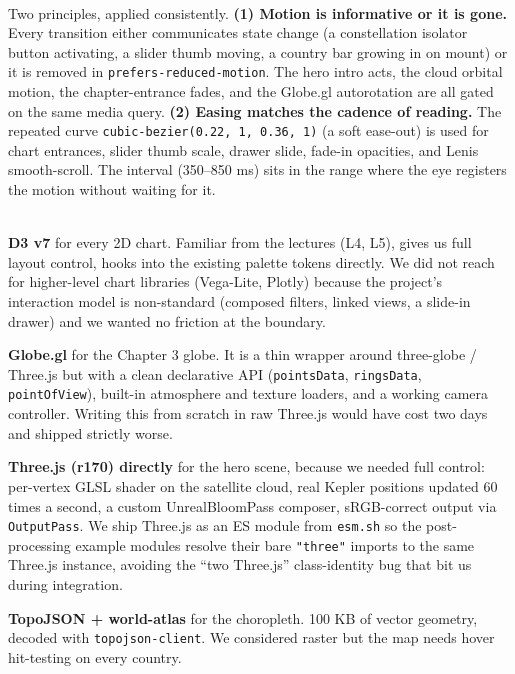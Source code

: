 \documentclass[9pt,a4paper]{article}
\newcommand{\subhead}[1]{%
  \vspace{4pt}%
  \noindent\tcbox[
    on line,
    colback=accentBlue!10!white, colframe=accentBlue,
    boxrule=0.3pt, arc=2.5pt,
    left=7pt, right=7pt, top=0.5pt, bottom=0.5pt,
  ]{\small\bfseries\color{accentBlue!85!black}#1}\\[2pt]%
}
\begin{document}
\vspace{2pt}

\subhead{Motion}

Two principles, applied consistently. \textbf{(1) Motion is informative or it is gone.} Every transition either communicates state change (a constellation isolator button activating, a slider thumb moving, a country bar growing in on mount) or it is removed in \texttt{prefers-reduced-motion}. The hero intro acts, the cloud orbital motion, the chapter-entrance fades, and the Globe.gl autorotation are all gated on the same media query. \textbf{(2) Easing matches the cadence of reading.} The repeated curve \texttt{cubic-bezier(0.22, 1, 0.36, 1)} (a soft ease-out) is used for chart entrances, slider thumb scale, drawer slide, fade-in opacities, and Lenis smooth-scroll. The interval (350--850 ms) sits in the range where the eye registers the motion without waiting for it.

\vspace{2pt}

\subhead{Library choices, with rationale}

\textbf{D3 v7} for every 2D chart. Familiar from the lectures (L4, L5), gives us full layout control, hooks into the existing palette tokens directly. We did not reach for higher-level chart libraries (Vega-Lite, Plotly) because the project's interaction model is non-standard (composed filters, linked views, a slide-in drawer) and we wanted no friction at the boundary.

\textbf{Globe.gl} for the Chapter 3 globe. It is a thin wrapper around three-globe / Three.js but with a clean declarative API (\texttt{pointsData}, \texttt{ringsData}, \texttt{pointOfView}), built-in atmosphere and texture loaders, and a working camera controller. Writing this from scratch in raw Three.js would have cost two days and shipped strictly worse.

\textbf{Three.js (r170) directly} for the hero scene, because we needed full control: per-vertex GLSL shader on the satellite cloud, real Kepler positions updated 60 times a second, a custom UnrealBloomPass composer, sRGB-correct output via \texttt{OutputPass}. We ship Three.js as an ES module from \texttt{esm.sh} so the post-processing example modules resolve their bare \texttt{"three"} imports to the same Three.js instance, avoiding the ``two Three.js'' class-identity bug that bit us during integration.

\textbf{TopoJSON + world-atlas} for the choropleth. 100 KB of vector geometry, decoded with \texttt{topojson-client}. We considered raster but the map needs hover hit-testing on every country.
\end{document}
